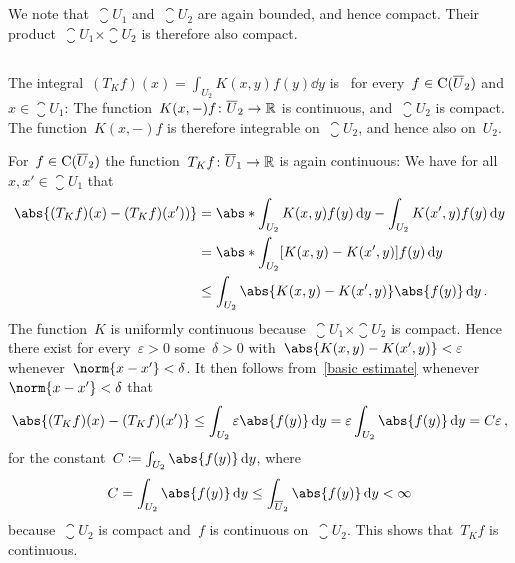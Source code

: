 \section{}

We note that~$\closure{U}_1$ and~$\closure{U}_2$ are again bounded, and hence compact.
Their product~$\closure{U}_1 \times \closure{U}_2$ is therefore also compact.





\subsection{}

The integral~$(T_K f)(x) = \int_{U_2} K(x,y) f(y) \dd{y}$ is~{\welldef} for every~$f \in \operatorname{C}(\overline{U}_2)$ and~$x \in \closure{U}_1$:
The function~$K(x,-)f \colon \overline{U}_2 \to \mathbb{R}$ is continuous, and~$\closure{U}_2$ is compact.
The function~$K(x,-)f$ is therefore integrable on~$\closure{U}_2$, and hence also on~$U_2$.

For~$f \in \operatorname{C}(\overline{U}_2)$ the function~$T_K f \colon \overline{U}_1 \to \mathbb{R}$ is again continuous:
We have for all~$x, x' \in \closure{U}_1$ that
\begin{equation}
  \label{basic estimate}
  \begin{aligned}
          \abs{ (T_K f)(x) - (T_K f)(x') ) }
    &=    \abs*{ \int_{U_2} K(x,y) f(y) \dd{y} - \int_{U_2} K(x',y) f(y) \dd{y} } \\
    &=    \abs*{ \int_{U_2} [K(x,y) - K(x',y)] f(y) \dd{y} }  \\
    &\leq \int_{U_2} \abs{K(x,y) - K(x',y)} \abs{f(y)} \dd{y} \,.
  \end{aligned}
\end{equation}
The function~$K$ is uniformly continuous because~$\closure{U}_1 \times \closure{U}_2$ is compact.
Hence there exist for every~$\varepsilon > 0$ some~$\delta > 0$ with~$\abs{K(x,y) - K(x',y)} < \varepsilon$ whenever~$\norm{x - x'} < \delta$.
It then follows from~\eqref{basic estimate} whenever~$\norm{x - x'} < \delta$ that
\[
        \abs{ (T_K f)(x) - (T_K f)(x') }
  \leq  \int_{U_2} \varepsilon \abs{f(y)} \dd{y}
  =     \varepsilon \int_{U_2} \abs{f(y)} \dd{y}
  =     C \varepsilon \,,
\]
for the constant~$C \defined \int_{U_2} \abs{f(y)} \dd{y}$, where
\[
        C
  =     \int_{U_2} \abs{f(y)} \dd{y}
  \leq  \int_{\closure{U}_2} \abs{f(y)} \dd{y}
  <     \infty
\]
because~$\closure{U}_2$ is compact and~$f$ is continuous on~$\closure{U}_2$.
This shows that~$T_K f$ is continuous.

